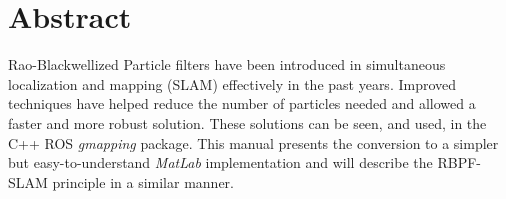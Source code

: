 \chapter{Abstract}
Rao-Blackwellized Particle filters have been introduced in simultaneous localization and mapping (SLAM) effectively in the past years. Improved techniques have helped reduce the number of particles needed and allowed a faster and more robust solution. These solutions can be seen, and used, in the C++ ROS \textit{gmapping} package. This manual presents the conversion to a simpler but easy-to-understand \textit{MatLab} implementation and will describe the RBPF-SLAM principle in a similar manner.